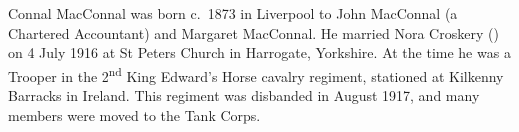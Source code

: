 
Connal MacConnal was born c.~1873 in  Liverpool \cite{ConnalNoraMarriage, ConnalFreeBMD} to John MacConnal (a Chartered Accountant) and Margaret MacConnal. \cite{CMacConnalBirth} He married Nora Croskery () on 4 July 1916 at St Peters Church in Harrogate, Yorkshire.\cite{ConnalNoraMarriage} At the time he was a Trooper in the 2\textsuperscript{nd} King Edward's Horse cavalry regiment, stationed at Kilkenny Barracks in Ireland.\cite{ConnalNoraMarriage} This regiment was disbanded in August 1917, and many members were moved to the Tank Corps.\cite{WP-KingEdsHorse}
